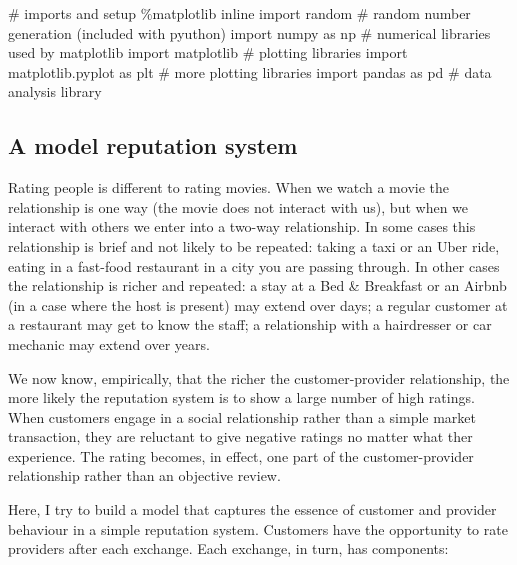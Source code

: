 \documentclass[
  letterpaper,
  DIV=11,
  numbers=noendperiod]{scrartcl}
\newenvironment{Shaded}{\begin{snugshade}}{\end{snugshade}}
\newcommand{\CommentTok}[1]{\textcolor[rgb]{0.37,0.37,0.37}{#1}}
\newcommand{\ImportTok}[1]{\textcolor[rgb]{0.00,0.46,0.62}{#1}}
\newcommand{\NormalTok}[1]{\textcolor[rgb]{0.00,0.23,0.31}{#1}}
\newcommand{\OperatorTok}[1]{\textcolor[rgb]{0.37,0.37,0.37}{#1}}
\begin{document}
\begin{Shaded}
\begin{Highlighting}[]
\CommentTok{\# imports and setup}
\OperatorTok{\%}\NormalTok{matplotlib inline}
\ImportTok{import}\NormalTok{ random }\CommentTok{\# random number generation (included with pyuthon)}
\ImportTok{import}\NormalTok{ numpy }\ImportTok{as}\NormalTok{ np }\CommentTok{\# numerical libraries used by matplotlib}
\ImportTok{import}\NormalTok{ matplotlib }\CommentTok{\# plotting libraries}
\ImportTok{import}\NormalTok{ matplotlib.pyplot }\ImportTok{as}\NormalTok{ plt }\CommentTok{\# more plotting libraries}
\ImportTok{import}\NormalTok{ pandas }\ImportTok{as}\NormalTok{ pd }\CommentTok{\# data analysis library}
\end{Highlighting}
\end{Shaded}

\hypertarget{a-model-reputation-system}{%
\subsection{A model reputation system}\label{a-model-reputation-system}}

Rating people is different to rating movies. When we watch a movie the
relationship is one way (the movie does not interact with us), but when
we interact with others we enter into a two-way relationship. In some
cases this relationship is brief and not likely to be repeated: taking a
taxi or an Uber ride, eating in a fast-food restaurant in a city you are
passing through. In other cases the relationship is richer and repeated:
a stay at a Bed \& Breakfast or an Airbnb (in a case where the host is
present) may extend over days; a regular customer at a restaurant may
get to know the staff; a relationship with a hairdresser or car mechanic
may extend over years.

We now know, empirically, that the richer the customer-provider
relationship, the more likely the reputation system is to show a large
number of high ratings. When customers engage in a social relationship
rather than a simple market transaction, they are reluctant to give
negative ratings no matter what ther experience. The rating becomes, in
effect, one part of the customer-provider relationship rather than an
objective review.

Here, I try to build a model that captures the essence of customer and
provider behaviour in a simple reputation system. Customers have the
opportunity to rate providers after each exchange. Each exchange, in
turn, has components:
\end{document}
